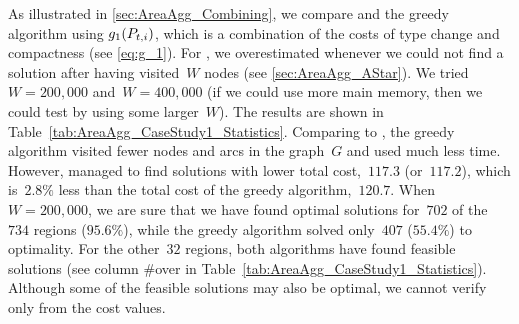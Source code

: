 As illustrated in \sect\ref{sec:AreaAgg_Combining},
we compare \Astar and the greedy algorithm using $g_1(P_{t,i})$,
which is a combination of the costs 
of type change and compactness (see \eq\ref{eq:g_1}).
For \Astar, we overestimated 
whenever we could not find a solution after 
having visited~$W$ nodes 
(see \sect\ref{sec:AreaAgg_AStar}).
We tried~$W=200{,}000$ and~$W=400{,}000$
(if we could use more main memory, 
then we could test by using some larger~$W$). 
The results are shown in 
Table~\ref{tab:AreaAgg_CaseStudy1_Statistics}.
%
Comparing to \Astar, 
the greedy algorithm visited 
fewer nodes and arcs in the graph~$G$ 
and used much less time.
However, 
\Astar managed to find solutions with 
lower total cost,~$117.3$ (or~$117.2$), 
which is~$2.8\%$ less than 
the total cost of the greedy algorithm,~$120.7$.
%
When~$W=200{,}000$, we are sure that 
we have found optimal solutions 
for~$702$ of the~$734$ regions ($95.6\%$),
while the greedy algorithm solved 
only~$407$ ($55.4\%$) to optimality.
For the other~$32$ regions, 
both algorithms have found feasible solutions 
(see column \#over in 
Table~\ref{tab:AreaAgg_CaseStudy1_Statistics}).
Although some of the feasible solutions may also be optimal,
we cannot verify only from the cost values.


